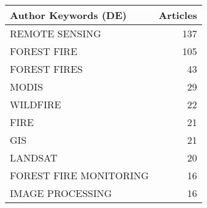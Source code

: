 
\begin{tabular}{lr}
\toprule
Author Keywords (DE) & Articles\\
\midrule
REMOTE SENSING & 137\\
FOREST FIRE & 105\\
FOREST FIRES & 43\\
MODIS & 29\\
WILDFIRE & 22\\
\addlinespace
FIRE & 21\\
GIS & 21\\
LANDSAT & 20\\
FOREST FIRE MONITORING & 16\\
IMAGE PROCESSING & 16\\
\bottomrule
\end{tabular}